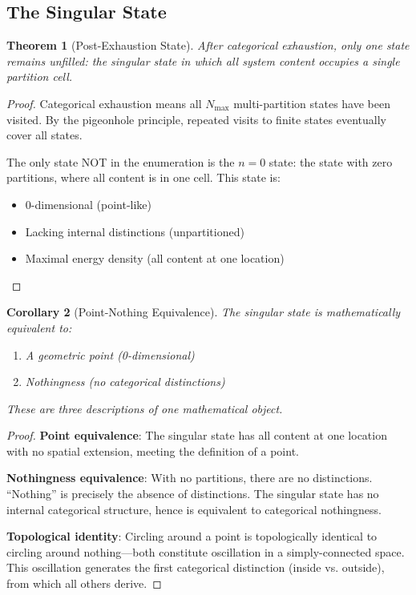 \documentclass[twocolumn,10pt,a4paper]{article}
\newtheorem{theorem}{Theorem}[section]
\newtheorem{corollary}[theorem]{Corollary}
\theoremstyle{definition}
\theoremstyle{remark}
\newcommand{\Nmax}{N_{\mathrm{max}}}
\begin{document}
\subsection{The Singular State}

\begin{theorem}[Post-Exhaustion State]
\label{thm:singular}
After categorical exhaustion, only one state remains unfilled: the \emph{singular state} in which all system content occupies a single partition cell.
\end{theorem}

\begin{proof}
Categorical exhaustion means all $\Nmax$ multi-partition states have been visited. By the pigeonhole principle, repeated visits to finite states eventually cover all states.

The only state NOT in the enumeration is the $n = 0$ state: the state with zero partitions, where all content is in one cell. This state is:
\begin{itemize}
    \item 0-dimensional (point-like)
    \item Lacking internal distinctions (unpartitioned)
    \item Maximal energy density (all content at one location)
\end{itemize}
\end{proof}

\begin{corollary}[Point-Nothing Equivalence]
\label{cor:equivalence}
The singular state is mathematically equivalent to:
\begin{enumerate}
    \item A geometric point (0-dimensional)
    \item Nothingness (no categorical distinctions)
\end{enumerate}
These are three descriptions of one mathematical object.
\end{corollary}

\begin{proof}
\textbf{Point equivalence}: The singular state has all content at one location with no spatial extension, meeting the definition of a point.

\textbf{Nothingness equivalence}: With no partitions, there are no distinctions. ``Nothing'' is precisely the absence of distinctions. The singular state has no internal categorical structure, hence is equivalent to categorical nothingness.

\textbf{Topological identity}: Circling around a point is topologically identical to circling around nothing---both constitute oscillation in a simply-connected space. This oscillation generates the first categorical distinction (inside vs. outside), from which all others derive.
\end{proof}
\end{document}
